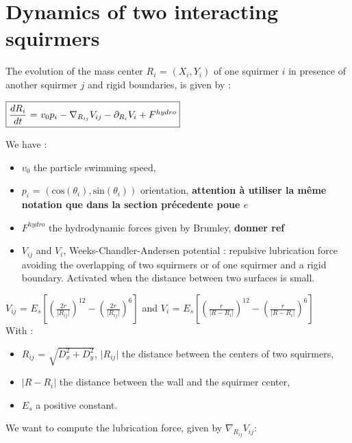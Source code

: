 \documentclass{article}
\begin{document}
\section{Dynamics of two interacting squirmers}
The evolution of the mass center $R_i$ = $(X_i, Y_i)$ of one squirmer $i$ in presence of 
another squirmer $j$ and rigid boundaries, is given by :
\begin{center}
$\boxed{\frac{dR_i}{dt}$ = $v_0 p_i -  \nabla_{R_{ij}} V_{ij} - \partial_{R_i} V_i + F^{hydro}}$
\end{center}
We have : \begin{itemize}
    \item $v_0$ the particle swimming speed,
    \item $p_i$ = $(\mathrm{cos}(\theta_i),\mathrm{sin}(\theta_i))$ orientation, 
    \textbf{attention à utiliser la même notation que dans la section précedente poue $e$}
    \item $F^{hydro}$ the hydrodynamic forces given by Brumley, \textbf{donner ref}
    \item $V_{ij}$ and $V_i$, Weeks-Chandler-Andersen potential : repulsive lubrication force avoiding the overlapping of two squirmers or of one squirmer and a rigid boundary. Activated when the distance between two surfaces is small.
\end{itemize} 
\vspace{0,5cm}
$V_{ij}$ = $E_s\left[\left(\frac{2r}{\lvert R_{ij}\rvert}\right)^{12} - \left(\frac{2r}{\lvert R_{ij}\rvert}\right)^6\right]$ and  $V_i$ = $E_s \left[ \left( \frac{r}{\lvert R - R_i \rvert} \right)^{12} - \left( \frac{r}{\lvert R - R_i \rvert} \right) ^6 \right]$ 
\vspace{0,3cm}
\\With : \begin{itemize}
    \item $R_{ij}$ = $\sqrt{D_x^2+D_y^2}$, $\lvert R_{ij} \rvert$ the distance between the centers of two squirmers,
    \item $\lvert R - R_i\rvert$ the distance between the wall and the squirmer center,
    \item $E_s$ a positive constant.
\end{itemize}

\vspace{0,5cm}
We want to compute the lubrication force, given by $\nabla_{R_{ij}} V_{ij}$:
\end{document}

